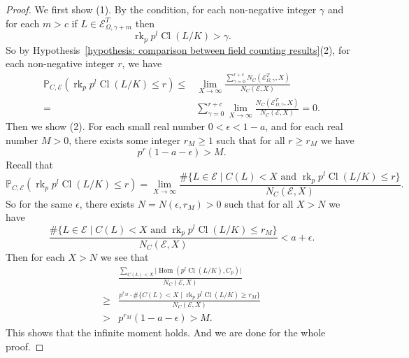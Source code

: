 \documentclass{amsart}
\numberwithin{equation}{section}
\theoremstyle{plain}
\theoremstyle{definition}
\theoremstyle{remark}
\begin{document}
\begin{proof}
	We first show (1).
	By the condition, for each non-negative integer $\gamma$ and for each $m>c$ if $L\in\mathcal{E}^{T}_{\Omega,\gamma+m}$ then
	\begin{equation*}
		\operatorname{rk}_p p^{l}\operatorname{Cl}(L/K)>\gamma.
	\end{equation*}
	So by Hypothesis~\ref{hypothesis: comparison between field counting results}(2), for each non-negative integer $r$, we have
	\begin{equation*}
		\begin{aligned}
			\mathbb{P}_{C,\mathcal{E}}(\operatorname{rk}_p p^l\operatorname{Cl}(L/K)\leq r)
			\leq&\lim_{X\to\infty}\frac{\sum_{\gamma=0}^{r+c}N_{C}(\mathcal{E}^{T}_{\Omega,\gamma},X)}{N_{C}(\mathcal{E},X)}\\
			=&\sum_{\gamma=0}^{r+c}\lim_{X\to\infty}\frac{N_{C}(\mathcal{E}^{T}_{\Omega,\gamma},X)}{N_{C}(\mathcal{E},X)}=0.
		\end{aligned}
	\end{equation*}	
	Then we show (2).
	For each small real number $0<\epsilon<1-a$, and for each real number $M>0$, there exists some integer $r_M\geq1$ such that for all $r\geq r_M$ we have 
	\begin{equation*}
		p^r(1-a-\epsilon)>M.
	\end{equation*}
	Recall that
	\begin{equation*}
		\mathbb{P}_{C,\mathcal{E}}(\operatorname{rk}_p p^{l}\operatorname{Cl}(L/K)\leq r)=
		\lim_{X\to\infty}
		\frac{\#\{L\in\mathcal{E}\mid C(L)<X\text{ and }\operatorname{rk}_p p^{l}\operatorname{Cl}(L/K)\leq r\}}
		{N_{C}(\mathcal{E},X)}.
	\end{equation*}
	So for the same $\epsilon$, there exists $N=N(\epsilon,r_M)>0$ such that for all $X>N$ we have
	\begin{equation*}
		\frac{\#\{L\in\mathcal{E}\mid C(L)<X\text{ and }\operatorname{rk}_p p^{l}\operatorname{Cl}(L/K)\leq r_M\}}
		{N_{C}(\mathcal{E},X)}<a+\epsilon.
	\end{equation*}
	Then for each $X>N$ we see that 
	\begin{equation*}
		\begin{aligned}
			&\frac{\sum_{C(L)<X}\lvert\operatorname{Hom}(p^l\operatorname{Cl}(L/K),C_p)\rvert}
			{N_{C}(\mathcal{E},X)}
			\\
			\geq&\frac{p^{r_M}\cdot\#\{C(L)<X\mid\operatorname{rk}_p p^l\operatorname{Cl}(L/K)\geq r_M\}}
			{N_{C}(\mathcal{E},X)}
			\\
			>&p^{r_M}(1-a-\epsilon)>M.
		\end{aligned}
	\end{equation*}
	This shows that the infinite moment holds.	
	And we are done for the whole proof.
\end{proof}
\end{document}
